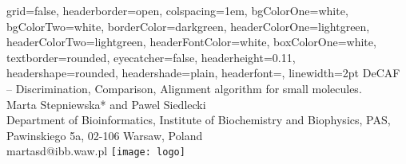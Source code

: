 \documentclass[a0paper,portrait]{baposter}
\begin{document}

\begin{poster}
{
grid=false,
headerborder=open, %
colspacing=1em, %
bgColorOne=white, %
bgColorTwo=white, %
borderColor=darkgreen, %
headerColorOne=lightgreen, %
headerColorTwo=lightgreen, %
headerFontColor=white, %
boxColorOne=white, %
textborder=rounded, %
eyecatcher=false, %
headerheight=0.11\textheight, %
headershape=rounded, %
headershade=plain,
headerfont=\Large\textsf, %
linewidth=2pt %
}
{}
%
%
{
\textsf %
{DeCAF -- Discrimination, Comparison, Alignment algorithm for small molecules.
}
} %
{\sf\vspace{0.5em}\\
Marta Stepniewska* and Pawel Siedlecki
\vspace{0.1em}\\
\small{Department of Bioinformatics, Institute of Biochemistry and Biophysics, PAS, Pawinskiego 5a, 02-106 Warsaw, Poland
\vspace{0.2em}\\
martasd@ibb.waw.pl}
}
{\texttt{[image: logo]}} %



\end{poster}
\end{document}
